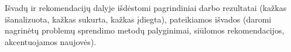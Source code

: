 \documentclass[fleqn]{VUMIFKompMagistrinis}
\begin{document}



Išvadų ir rekomendacijų dalyje išdėstomi pagrindiniai darbo rezultatai (kažkas
išanalizuota, kažkas sukurta, kažkas įdiegta), pateikiamos išvados (daromi
nagrinėtų problemų sprendimo metodų palyginimai, siūlomos rekomendacijos,
akcentuojamos naujovės).


\printbibliography[heading=bibintoc]  %
\end{document}
